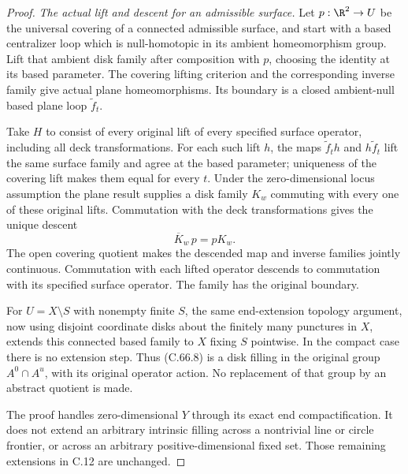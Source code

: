 \begin{proof}
\emph{The actual lift and descent for an admissible surface.}
Let $p:\R^2\to U$ be the universal covering of a
connected admissible surface, and start with a
based centralizer loop which is null-homotopic
in its ambient homeomorphism group.
Lift that ambient disk family after composition
with $p$, choosing the identity at its based
parameter. The covering lifting criterion and
the corresponding inverse family give actual
plane homeomorphisms. Its boundary is a closed
ambient-null based plane loop $\widetilde f_t$.

Take $H$ to consist of every original lift of
every specified surface operator, including
all deck transformations. For each such lift
$h$, the maps $\widetilde f_t h$ and
$h\widetilde f_t$ lift the same surface family
and agree at the based parameter; uniqueness
of the covering lift makes them equal for
every $t$. Under the zero-dimensional locus
assumption the plane result supplies a disk
family $K_w$ commuting with every one of
these original lifts. Commutation with the
deck transformations gives the unique descent
\[
                    \overline K_w\,p=pK_w .
                                                               \tag{C.66.8}
\]
The open covering quotient makes the descended
map and inverse families jointly continuous.
Commutation with each lifted operator descends
to commutation with its specified surface
operator. The family has the original boundary.

For $U=X\setminus S$ with nonempty finite $S$,
the same end-extension topology argument, now
using disjoint coordinate disks about the
finitely many punctures in $X$, extends this
connected based family to $X$ fixing $S$
pointwise. In the compact case there is no
extension step. Thus (C.66.8) is a disk filling
in the original group $A^0\cap A^u$, with
its original operator action. No replacement
of that group by an abstract quotient is made.

The proof handles zero-dimensional $Y$ through
its exact end compactification. It does not
extend an arbitrary intrinsic filling across
a nontrivial line or circle frontier, or across
an arbitrary positive-dimensional fixed set.
Those remaining extensions in C.12 are unchanged.
\end{proof}
